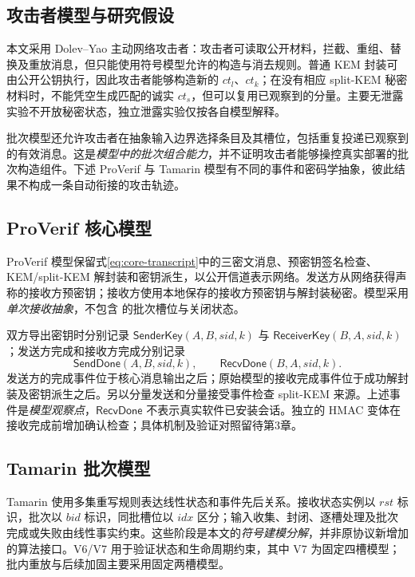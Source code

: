 \subsection{攻击者模型与研究假设}
\label{subsec:formal-adversary}

本文采用 Dolev--Yao 主动网络攻击者：攻击者可读取公开材料，拦截、重组、替换及重放消息，但只能使用符号模型允许的构造与消去规则。普通 KEM 封装可由公开公钥执行，因此攻击者能够构造新的 $ct_l$、$ct_k$；在没有相应 split-KEM 秘密材料时，不能凭空生成匹配的诚实 $ct_s$，但可以复用已观察到的分量。主要无泄露实验不开放秘密状态，独立泄露实验仅按各自模型解释。

批次模型还允许攻击者在抽象输入边界选择条目及其槽位，包括重复投递已观察到的有效消息。这是\emph{模型中的批次组合能力}，并不证明攻击者能够操控真实部署的批次构造组件。下述 ProVerif 与 Tamarin 模型有不同的事件和密码学抽象，彼此结果不构成一条自动衔接的攻击轨迹。

\subsection{ProVerif 核心模型}
\label{subsec:proverif-core}

ProVerif 模型保留式\eqref{eq:core-transcript}中的三密文消息、预密钥签名检查、KEM/split-KEM 解封装和密钥派生，以公开信道表示网络。发送方从网络获得声称的接收方预密钥；接收方使用本地保存的接收方预密钥与解封装秘密。模型采用\emph{单次接收抽象}，不包含 \batchreceive 的批次槽位与关闭状态。

双方导出密钥时分别记录 $\mathsf{SenderKey}(A,B,sid,k)$ 与 $\mathsf{ReceiverKey}(B,A,sid,k)$；发送方完成和接收方完成分别记录
\begin{equation}
 \mathsf{SendDone}(A,B,sid,k),\qquad
 \mathsf{RecvDone}(B,A,sid,k).
 \label{eq:core-events}
\end{equation}
发送方的完成事件位于核心消息输出之后；原始模型的接收完成事件位于成功解封装及密钥派生之后。另以分量发送和分量接受事件检查 split-KEM 来源。上述事件是\emph{模型观察点}，$\mathsf{RecvDone}$ 不表示真实软件已安装会话。独立的 HMAC 变体在接收完成前增加确认检查；具体机制及验证对照留待第3章。

\subsection{Tamarin 批次模型}
\label{subsec:tamarin-batch}

Tamarin 使用多集重写规则表达线性状态和事件先后关系\cite{meier2013tamarin}。接收状态实例以 $rst$ 标识，批次以 $bid$ 标识，同批槽位以 $idx$ 区分；输入收集、封闭、逐槽处理及批次完成或失败由线性事实约束。这些阶段是本文的\emph{符号建模分解}，并非原协议新增加的算法接口。V6/V7 用于验证状态和生命周期约束，其中 V7 为固定四槽模型；批内重放与后续加固主要采用固定两槽模型。

